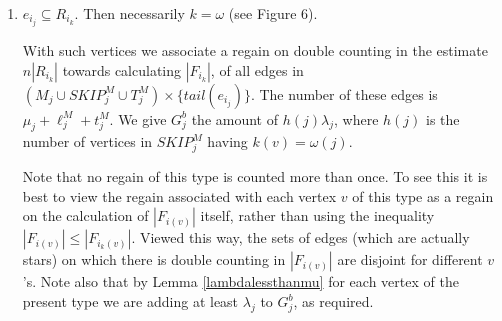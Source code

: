 \documentclass{amsart}
\theoremstyle{remark}
\newcommand{\eij}{e_{i_j}}
\newcommand{\eik}{e_{i_k}}
\newcommand{\rik}{R_{i_k}}
\newcommand{\fik}{F_{i_k}}
\newcommand{\ljm}{{\ell}_{j}^M}
\newcommand{\tjm}{t^M_j}
\newcommand{\Tjm}{T^M_j}
\newcommand{\skipmj}{{SKIP}^M_j}
\begin{document}
\begin{enumerate}
\begin{enumerate}
 In this case  $k$ procrastinates with respect to $j$,
which entitles us to a regain of $s_kn$. Note that there
are at most $s_k-1$ vertices $v \in \skipmj$ that are tails of long edges, and satisfy $k(v)=k$.
So, distributing this gain among the vertices $v \in \skipmj$
that are tails of long edges, and satisfy $k(v)=k$, each gets at least a gain of $n$. Remembering that $\lambda_j<n$, we are fulfilling the requirement of ``$\lambda_j$ gain in $G^b_j$ for every vertex in $\skipmj$''.

The splitting of the gain between $G_j$ and $G_k$ is done in this
case according to a still finer classification into subcases:

\begin{enumerate}

\item $\eij$ and $\eik$ cross (see Definition \ref{crossing}.  We do not discern in this case
between the cases  $tail(\eik) \in M$ and $tail(\eik) \in W$ - see
Figures 4 and 5 for the two possibilities. We give a gain of $n-1$
to $G^b_j$, saving $1$ for a fine point below (see remark after case
(3)). By Observation \ref{lambdalessthann}  we are giving $G^b_j$ at
least $\lambda_j$, as required.
\item $\eij$ and $\eik$ are parallel.
Here $k$ is procrastinating with respect to $j$, and thus we are
entitled to a gain of $s_kn$. This is the same as Case (1), with the
roles of $j$ and $k$ reversed. This regain (that is shared between
stages $j$ and $k$) was considered in (1) for  stage $i_k$, and
hence we do not distribute regains for this case. But recall that
$G_j^b$ gets in stage $i_k$ its share of $(s_k-1)(\mu_k+\lambda_k)$
(keep in mind that the roles of the indices $j$ and $k$ are
reversed). By Lemma \ref{lambdasmall} this quantity is at least
$\lambda_j$ for each such vertex.\\
\end{enumerate}

\item $\eij \subseteq \rik$.  Then necessarily $k=\omega$ (see Figure 6).

With such vertices we associate a regain on double counting in the estimate $n|\rik|$ towards calculating
$|\fik|$, of all edges in $(M_j \cup \skipmj \cup \Tjm)\times
\{tail(\eij)\}$. The number of these edges is $\mu_j+\ljm+\tjm$. We give $G^b_j$ the amount of $h(j)\lambda_j$,
where $h(j)$ is the number of vertices in $\skipmj$ having $k(v)=\omega(j)$.

Note that no regain of this type is counted more than once. To see
this it is best to view the regain associated with each vertex  $v$
of this type as a regain on the calculation of $|F_{i(v)}|$ itself,
rather than using the inequality  $|F_{i(v)}| \le |F_{i_k(v)}|$.
Viewed this way, the sets of edges (which are actually stars) on
which there is double counting in $|F_{i(v)}|$ are disjoint for
different $v$'s. Note also that by
Lemma \ref{lambdalessthanmu} for each vertex of the present type we are adding at least $\lambda_j$ to $G^b_j$, as required. \\
\end{enumerate}


\end{enumerate}
\end{document}
